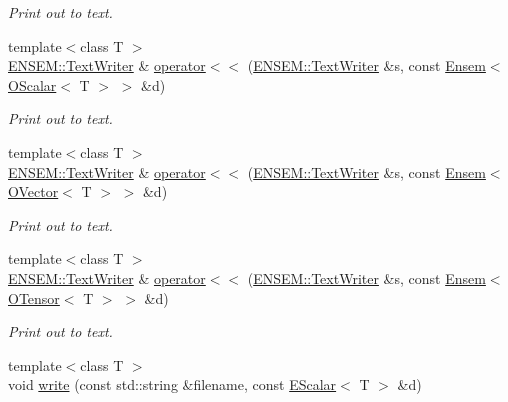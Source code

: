 \begin{DoxyCompactItemize}
\begin{DoxyCompactList}\small\item\em Print out to text. \end{DoxyCompactList}\item 
{\footnotesize template$<$class T $>$ }\\\mbox{\hyperlink{classENSEM_1_1TextWriter}{E\+N\+S\+E\+M\+::\+Text\+Writer}} \& \mbox{\hyperlink{namespaceENSEM_af434a2aefc7c29bdad68fc50cdeda436}{operator$<$$<$}} (\mbox{\hyperlink{classENSEM_1_1TextWriter}{E\+N\+S\+E\+M\+::\+Text\+Writer}} \&s, const \mbox{\hyperlink{classENSEM_1_1Ensem}{Ensem}}$<$ \mbox{\hyperlink{classENSEM_1_1OScalar}{O\+Scalar}}$<$ T $>$ $>$ \&d)
\begin{DoxyCompactList}\small\item\em Print out to text. \end{DoxyCompactList}\item 
{\footnotesize template$<$class T $>$ }\\\mbox{\hyperlink{classENSEM_1_1TextWriter}{E\+N\+S\+E\+M\+::\+Text\+Writer}} \& \mbox{\hyperlink{namespaceENSEM_a3c090895fd0fa6d7da4aad84a847056f}{operator$<$$<$}} (\mbox{\hyperlink{classENSEM_1_1TextWriter}{E\+N\+S\+E\+M\+::\+Text\+Writer}} \&s, const \mbox{\hyperlink{classENSEM_1_1Ensem}{Ensem}}$<$ \mbox{\hyperlink{classENSEM_1_1OVector}{O\+Vector}}$<$ T $>$ $>$ \&d)
\begin{DoxyCompactList}\small\item\em Print out to text. \end{DoxyCompactList}\item 
{\footnotesize template$<$class T $>$ }\\\mbox{\hyperlink{classENSEM_1_1TextWriter}{E\+N\+S\+E\+M\+::\+Text\+Writer}} \& \mbox{\hyperlink{namespaceENSEM_ab439878443da80b5f8032475e52cfc90}{operator$<$$<$}} (\mbox{\hyperlink{classENSEM_1_1TextWriter}{E\+N\+S\+E\+M\+::\+Text\+Writer}} \&s, const \mbox{\hyperlink{classENSEM_1_1Ensem}{Ensem}}$<$ \mbox{\hyperlink{classENSEM_1_1OTensor}{O\+Tensor}}$<$ T $>$ $>$ \&d)
\begin{DoxyCompactList}\small\item\em Print out to text. \end{DoxyCompactList}\item 
{\footnotesize template$<$class T $>$ }\\void \mbox{\hyperlink{namespaceENSEM_a5360eb9dd0dfcdb3fcf8f085117ddf8a}{write}} (const std\+::string \&filename, const \mbox{\hyperlink{classENSEM_1_1EScalar}{E\+Scalar}}$<$ T $>$ \&d)

\end{DoxyCompactItemize}
